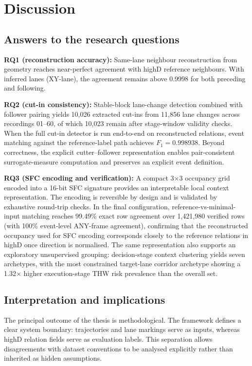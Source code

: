 \documentclass[12pt,a4paper,twoside,openright]{report}
\begin{document}
    \chapter{Discussion}
    \label{chap:discussion}

    \section{Answers to the research questions}
    \textbf{RQ1 (reconstruction accuracy):} Same-lane neighbour reconstruction from geometry reaches near-perfect agreement with highD reference neighbours. With inferred lanes (XY-lane), the agreement remains above 0.9998 for both preceding and following.

    \textbf{RQ2 (cut-in consistency):} Stable-block lane-change detection combined with follower pairing yields 10,026 extracted cut-ins from 11,856 lane changes across recordings 01--60, of which 10,023 remain after stage-window validity checks. When the full cut-in detector is run end-to-end on reconstructed relations, event matching against the reference-label path achieves $F_1 = 0.998938$. Beyond correctness, the explicit cutter--follower representation enables pair-consistent surrogate-measure computation and preserves an explicit event definition.

    \textbf{RQ3 (SFC encoding and verification):} A compact 3$\times$3 occupancy grid encoded into a 16-bit SFC signature provides an interpretable local context representation. The encoding is reversible by design and is validated by exhaustive round-trip checks. In the final configuration, reference-vs-minimal-input matching reaches 99.49\% exact row agreement over 1,421,980 verified rows (with 100\% event-level ANY-frame agreement), confirming that the reconstructed occupancy used for SFC encoding corresponds closely to the reference relations in highD once direction is normalised. The same representation also supports an exploratory unsupervised grouping: decision-stage context clustering yields seven archetypes, with the most constrained target-lane corridor archetype showing a 1.32$\times$ higher execution-stage THW risk prevalence than the overall set.

    \section{Interpretation and implications}
    The principal outcome of the thesis is methodological. The framework defines a clear system boundary: trajectories and lane markings serve as inputs, whereas highD relation fields serve as evaluation labels. This separation allows disagreements with dataset conventions to be analysed explicitly rather than inherited as hidden assumptions.
\end{document}
